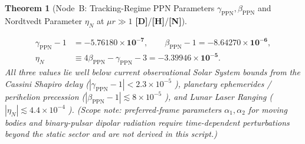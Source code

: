 \documentclass[11pt,a4paper]{article}
\newcommand{\catD}{\textbf{\textcolor{blue!75!black}{[D]}}}
\newcommand{\catH}{\textbf{\textcolor{orange!85!black}{[H]}}}
\newcommand{\catN}{\textbf{\textcolor{teal!75!black}{[N]}}}
\newtheorem{theorem}{Theorem}[section]
\theoremstyle{definition}
\theoremstyle{remark}
\begin{document}
\begin{theorem}[Node~B: Tracking-Regime PPN Parameters $\gamma_{\text{PPN}}, \beta_{\text{PPN}}$ and Nordtvedt Parameter $\eta_N$ at $\mu r \gg 1$ \catD/\catH/\catN]
\begin{enumerate}
  \begin{equation}
  \begin{aligned}
    \gamma_{\text{PPN}} - 1 &= \mathbf{-5.76180 \times 10^{-7}}, \qquad
    \beta_{\text{PPN}} - 1 = \mathbf{-8.64270 \times 10^{-6}}, \\[3pt]
    \eta_N &\equiv 4\beta_{\text{PPN}} - \gamma_{\text{PPN}} - 3 = \mathbf{-3.39946 \times 10^{-5}}.
  \end{aligned}
  \label{eq:node_b_numerical_values}
  \end{equation}
  All three values lie well below current observational Solar System bounds from the Cassini Shapiro delay ($|\gamma_{\text{PPN}} - 1| < 2.3 \times 10^{-5}$ \cite{Bertotti2003,Will2014}), planetary ephemerides / perihelion precession ($|\beta_{\text{PPN}} - 1| \lesssim 8 \times 10^{-5}$ \cite{Will2014}), and Lunar Laser Ranging ($|\eta_N| \lesssim 4.4 \times 10^{-4}$ \cite{Williams2012_LLR,Will2014}). (Scope note: preferred-frame parameters $\alpha_1, \alpha_2$ for moving bodies and binary-pulsar dipolar radiation require time-dependent perturbations beyond the static sector and are not derived in this script.)
\end{enumerate}
\end{theorem}
\end{document}
